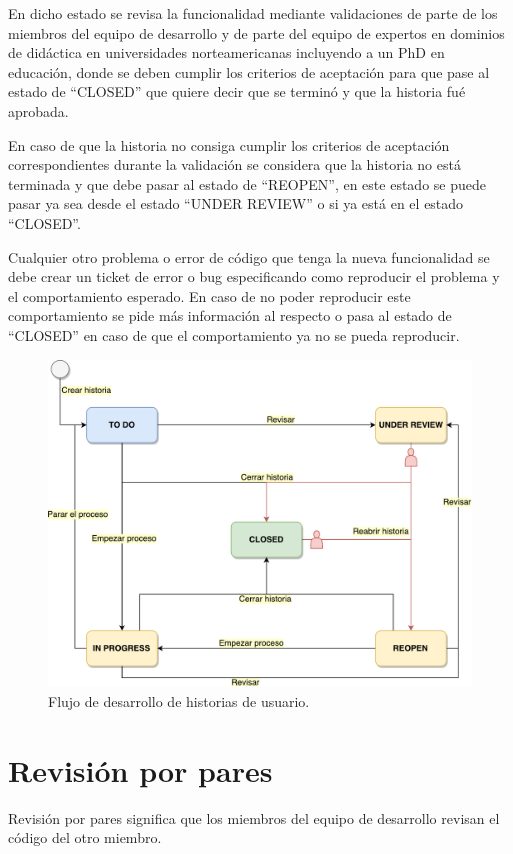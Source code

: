En dicho estado se revisa la funcionalidad mediante validaciones de parte de los miembros del equipo de desarrollo y de parte del equipo de expertos en dominios de didáctica en universidades norteamericanas incluyendo a un PhD en educación, donde se deben cumplir los criterios de aceptación para que pase al estado de \enquote{CLOSED} que quiere decir que se terminó y que la historia fué aprobada.  

En caso de que la historia no consiga cumplir los criterios de aceptación correspondientes durante la validación se considera que la historia no está terminada y que debe pasar al estado de \enquote{REOPEN}, en este estado se puede pasar ya sea desde el estado \enquote{UNDER REVIEW} o si ya está en el estado \enquote{CLOSED}.

Cualquier otro problema o error de código que tenga la nueva funcionalidad se debe crear un ticket de error o bug especificando como reproducir el problema y el comportamiento esperado. En caso de no poder reproducir este comportamiento se pide más información al respecto o pasa al estado de \enquote{CLOSED} en caso de que el comportamiento ya no se pueda reproducir.

\begin{figure}[]
\centering
\includegraphics[scale=0.4]{Figuras/workflow}
\caption{Flujo de desarrollo de historias de usuario.}
  \label{workflow}
\end{figure}

\section{Revisión por pares}
Revisión por pares significa que los miembros del equipo de desarrollo revisan el código del otro miembro.

